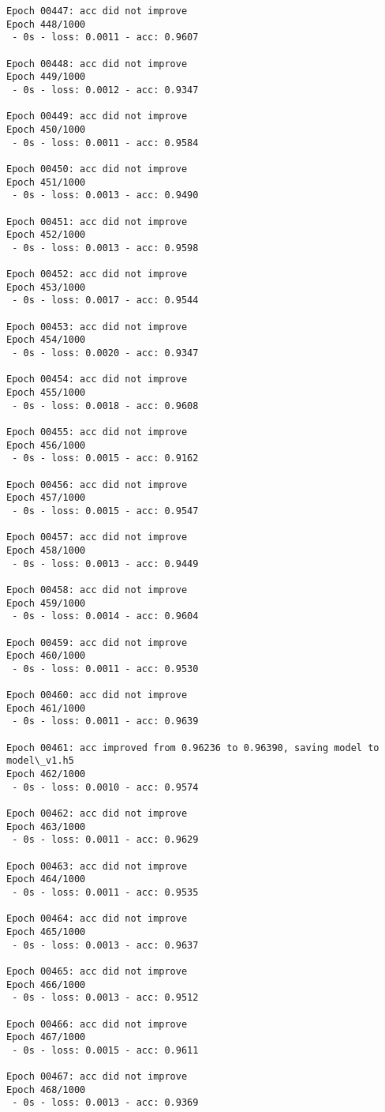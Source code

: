 \documentclass[11pt]{article}
\begin{document}
\begin{Verbatim}[commandchars=\\\{\}]
Epoch 00447: acc did not improve
Epoch 448/1000
 - 0s - loss: 0.0011 - acc: 0.9607

Epoch 00448: acc did not improve
Epoch 449/1000
 - 0s - loss: 0.0012 - acc: 0.9347

Epoch 00449: acc did not improve
Epoch 450/1000
 - 0s - loss: 0.0011 - acc: 0.9584

Epoch 00450: acc did not improve
Epoch 451/1000
 - 0s - loss: 0.0013 - acc: 0.9490

Epoch 00451: acc did not improve
Epoch 452/1000
 - 0s - loss: 0.0013 - acc: 0.9598

Epoch 00452: acc did not improve
Epoch 453/1000
 - 0s - loss: 0.0017 - acc: 0.9544

Epoch 00453: acc did not improve
Epoch 454/1000
 - 0s - loss: 0.0020 - acc: 0.9347

Epoch 00454: acc did not improve
Epoch 455/1000
 - 0s - loss: 0.0018 - acc: 0.9608

Epoch 00455: acc did not improve
Epoch 456/1000
 - 0s - loss: 0.0015 - acc: 0.9162

Epoch 00456: acc did not improve
Epoch 457/1000
 - 0s - loss: 0.0015 - acc: 0.9547

Epoch 00457: acc did not improve
Epoch 458/1000
 - 0s - loss: 0.0013 - acc: 0.9449

Epoch 00458: acc did not improve
Epoch 459/1000
 - 0s - loss: 0.0014 - acc: 0.9604

Epoch 00459: acc did not improve
Epoch 460/1000
 - 0s - loss: 0.0011 - acc: 0.9530

Epoch 00460: acc did not improve
Epoch 461/1000
 - 0s - loss: 0.0011 - acc: 0.9639

Epoch 00461: acc improved from 0.96236 to 0.96390, saving model to model\_v1.h5
Epoch 462/1000
 - 0s - loss: 0.0010 - acc: 0.9574

Epoch 00462: acc did not improve
Epoch 463/1000
 - 0s - loss: 0.0011 - acc: 0.9629

Epoch 00463: acc did not improve
Epoch 464/1000
 - 0s - loss: 0.0011 - acc: 0.9535

Epoch 00464: acc did not improve
Epoch 465/1000
 - 0s - loss: 0.0013 - acc: 0.9637

Epoch 00465: acc did not improve
Epoch 466/1000
 - 0s - loss: 0.0013 - acc: 0.9512

Epoch 00466: acc did not improve
Epoch 467/1000
 - 0s - loss: 0.0015 - acc: 0.9611

Epoch 00467: acc did not improve
Epoch 468/1000
 - 0s - loss: 0.0013 - acc: 0.9369


\end{Verbatim}
\end{document}
